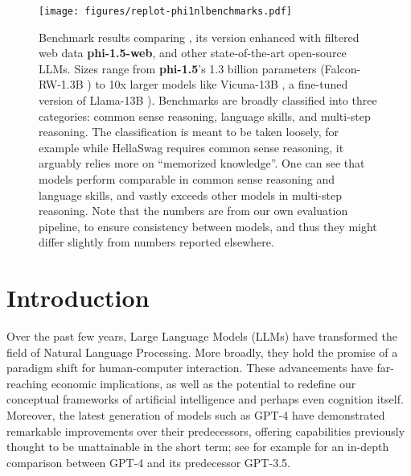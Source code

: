 \begin{figure}[hb]
\begin{center}
\texttt{[image: figures/replot-phi1nlbenchmarks.pdf]}
\end{center}
\caption{Benchmark results comparing \phionepointfive, its version enhanced with filtered web data \textbf{phi-1.5-web}, and other state-of-the-art open-source LLMs. Sizes range from \textbf{phi-1.5}'s 1.3 billion parameters (Falcon-RW-1.3B \cite{penedo2023refinedweb}) to 10x larger models like Vicuna-13B \cite{zheng2023judging}, a fine-tuned version of Llama-13B \cite{touvron2023llama}).
Benchmarks are broadly classified into three categories: common sense reasoning, language skills, and multi-step reasoning. The classification is meant to be taken loosely, for example while HellaSwag requires common sense reasoning, it arguably relies more on ``memorized knowledge''. One can see that \phionenlnointer models perform comparable in common sense reasoning and language skills, and vastly exceeds other models in multi-step reasoning. Note that the numbers are from our own evaluation pipeline, to ensure consistency between models, and thus they might differ slightly from numbers reported elsewhere.}
\label{fig:summary}
\end{figure}
\newpage

\section{Introduction}
Over the past few years, Large Language Models (LLMs) have transformed the field of Natural Language Processing. More broadly, they hold the promise of a paradigm shift for human-computer interaction. These advancements have far-reaching economic implications, as well as the potential to redefine our conceptual frameworks of artificial intelligence and perhaps even cognition itself. Moreover, the latest generation of models such as GPT-4 \cite{gpt4} have demonstrated remarkable improvements over their predecessors, offering capabilities previously thought to be unattainable in the short term; see for example \cite{sparks} for an in-depth comparison between GPT-4 and its predecessor GPT-3.5.

